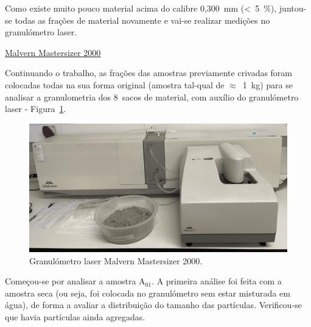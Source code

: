 Como existe muito pouco material acima do calibre 0,300~mm (<~5~\%), juntou-se todas as frações de material novamente e vai-se realizar medições no granulómetro laser.

\hrulefill
\pagebreak


 \href{https://www.malvernpanalytical.com/en/support/product-support/mastersizer-range/mastersizer-2000}{Malvern Mastersizer 2000}


Continuando o trabalho, as frações das amostras previamente crivadas foram colocadas todas na sua forma original (amostra tal-qual de $\approx$~1~kg) para se analisar a granulometria dos 8~sacos de material, com auxílio do granulómetro laser - Figura~\ref{fig:granulometro_laser}.

\begin{figure}[!htb]
    \centering
    \includegraphics[width=0.75\linewidth]{figures/granulometro_laser}
    \caption{Granulómetro laser Malvern Mastersizer 2000.}
    \label{fig:granulometro_laser}
\end{figure}

Começou-se por analisar a amostra A$_{01}$.
A primeira análise foi feita com a amostra seca (ou seja, foi colocada no granulómetro sem estar misturada em água), de forma a avaliar a distribuição do tamanho das partículas.
Verificou-se que havia partículas ainda agregadas.

